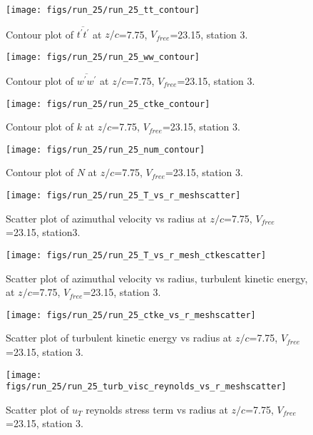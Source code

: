 \begin{figure}[H]
\centering
\texttt{[image: figs/run\_25/run\_25\_tt\_contour]}
\caption{Contour plot of $\overline{t^\prime t^\prime}$ at $z/c$=7.75, $V_{free}$=23.15, station 3.}
\end{figure}


\begin{figure}[H]
\centering
\texttt{[image: figs/run\_25/run\_25\_ww\_contour]}
\caption{Contour plot of $\overline{w^\prime w^\prime}$ at $z/c$=7.75, $V_{free}$=23.15, station 3.}
\end{figure}


\begin{figure}[H]
\centering
\texttt{[image: figs/run\_25/run\_25\_ctke\_contour]}
\caption{Contour plot of $k$ at $z/c$=7.75, $V_{free}$=23.15, station 3.}
\end{figure}


\begin{figure}[H]
\centering
\texttt{[image: figs/run\_25/run\_25\_num\_contour]}
\caption{Contour plot of $N$ at $z/c$=7.75, $V_{free}$=23.15, station 3.}
\end{figure}


\begin{figure}[H]
\centering
\texttt{[image: figs/run\_25/run\_25\_T\_vs\_r\_meshscatter]}
\caption{Scatter plot of azimuthal velocity vs radius at $z/c$=7.75, $V_{free}$=23.15, station3.}
\end{figure}


\begin{figure}[H]
\centering
\texttt{[image: figs/run\_25/run\_25\_T\_vs\_r\_mesh\_ctkescatter]}
\caption{Scatter plot of azimuthal velocity vs radius, turbulent kinetic energy, at $z/c$=7.75, $V_{free}$=23.15, station 3.}
\end{figure}


\begin{figure}[H]
\centering
\texttt{[image: figs/run\_25/run\_25\_ctke\_vs\_r\_meshscatter]}
\caption{Scatter plot of turbulent kinetic energy vs radius at $z/c$=7.75, $V_{free}$=23.15, station 3.}
\end{figure}


\begin{figure}[H]
\centering
\texttt{[image: figs/run\_25/run\_25\_turb\_visc\_reynolds\_vs\_r\_meshscatter]}
\caption{Scatter plot of $
u_T$ reynolds stress term vs radius at $z/c$=7.75, $V_{free}$=23.15, station 3.}
\end{figure}


